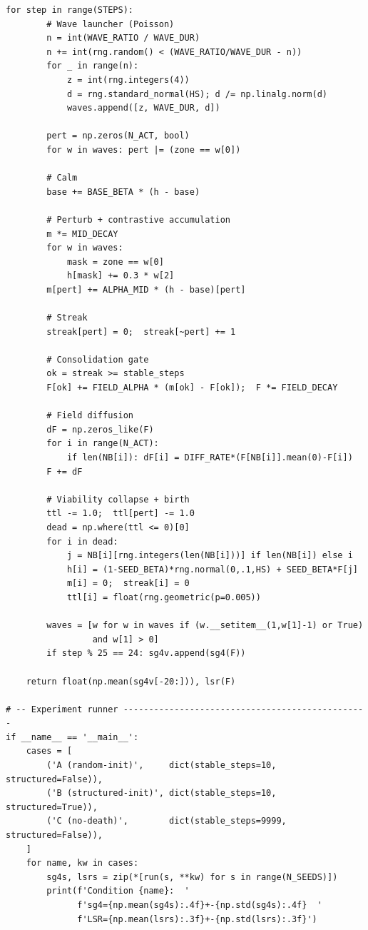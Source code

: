 \documentclass[11pt,twocolumn]{article}
\begin{document}
\begin{lstlisting}[caption={vcsm\_paper0\_repro.py}]
    for step in range(STEPS):
        # Wave launcher (Poisson)
        n = int(WAVE_RATIO / WAVE_DUR)
        n += int(rng.random() < (WAVE_RATIO/WAVE_DUR - n))
        for _ in range(n):
            z = int(rng.integers(4))
            d = rng.standard_normal(HS); d /= np.linalg.norm(d)
            waves.append([z, WAVE_DUR, d])

        pert = np.zeros(N_ACT, bool)
        for w in waves: pert |= (zone == w[0])

        # Calm
        base += BASE_BETA * (h - base)

        # Perturb + contrastive accumulation
        m *= MID_DECAY
        for w in waves:
            mask = zone == w[0]
            h[mask] += 0.3 * w[2]
        m[pert] += ALPHA_MID * (h - base)[pert]

        # Streak
        streak[pert] = 0;  streak[~pert] += 1

        # Consolidation gate
        ok = streak >= stable_steps
        F[ok] += FIELD_ALPHA * (m[ok] - F[ok]);  F *= FIELD_DECAY

        # Field diffusion
        dF = np.zeros_like(F)
        for i in range(N_ACT):
            if len(NB[i]): dF[i] = DIFF_RATE*(F[NB[i]].mean(0)-F[i])
        F += dF

        # Viability collapse + birth
        ttl -= 1.0;  ttl[pert] -= 1.0
        dead = np.where(ttl <= 0)[0]
        for i in dead:
            j = NB[i][rng.integers(len(NB[i]))] if len(NB[i]) else i
            h[i] = (1-SEED_BETA)*rng.normal(0,.1,HS) + SEED_BETA*F[j]
            m[i] = 0;  streak[i] = 0
            ttl[i] = float(rng.geometric(p=0.005))

        waves = [w for w in waves if (w.__setitem__(1,w[1]-1) or True)
                 and w[1] > 0]
        if step % 25 == 24: sg4v.append(sg4(F))

    return float(np.mean(sg4v[-20:])), lsr(F)

# -- Experiment runner ------------------------------------------------
if __name__ == '__main__':
    cases = [
        ('A (random-init)',     dict(stable_steps=10,   structured=False)),
        ('B (structured-init)', dict(stable_steps=10,   structured=True)),
        ('C (no-death)',        dict(stable_steps=9999, structured=False)),
    ]
    for name, kw in cases:
        sg4s, lsrs = zip(*[run(s, **kw) for s in range(N_SEEDS)])
        print(f'Condition {name}:  '
              f'sg4={np.mean(sg4s):.4f}+-{np.std(sg4s):.4f}  '
              f'LSR={np.mean(lsrs):.3f}+-{np.std(lsrs):.3f}')
\end{lstlisting}
\end{document}

